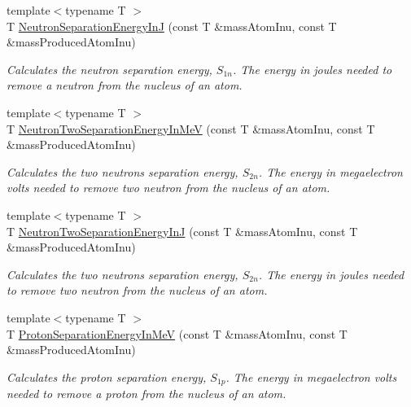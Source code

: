 \begin{DoxyCompactItemize}
{\footnotesize template$<$typename T $>$ }\\T \mbox{\hyperlink{group___e_g_x_phys-_nuclear_separation_energy_ga14a4bb972ae000ef4ff35f2734ff22d0}{Neutron\+Separation\+Energy\+InJ}} (const T \&mass\+Atom\+Inu, const T \&mass\+Produced\+Atom\+Inu)
\begin{DoxyCompactList}\small\item\em Calculates the neutron separation energy, $S_{1n}$. The energy in joules needed to remove a neutron from the nucleus of an atom. \end{DoxyCompactList}\item 
{\footnotesize template$<$typename T $>$ }\\T \mbox{\hyperlink{group___e_g_x_phys-_nuclear_separation_energy_ga09985fc876eb632695bfbc1f2f325401}{Neutron\+Two\+Separation\+Energy\+In\+MeV}} (const T \&mass\+Atom\+Inu, const T \&mass\+Produced\+Atom\+Inu)
\begin{DoxyCompactList}\small\item\em Calculates the two neutrons separation energy, $S_{2n}$. The energy in megaelectron volts needed to remove two neutron from the nucleus of an atom. \end{DoxyCompactList}\item 
{\footnotesize template$<$typename T $>$ }\\T \mbox{\hyperlink{group___e_g_x_phys-_nuclear_separation_energy_ga293ac9428420a0adf4235048dbe529b4}{Neutron\+Two\+Separation\+Energy\+InJ}} (const T \&mass\+Atom\+Inu, const T \&mass\+Produced\+Atom\+Inu)
\begin{DoxyCompactList}\small\item\em Calculates the two neutrons separation energy, $S_{2n}$. The energy in joules needed to remove two neutron from the nucleus of an atom. \end{DoxyCompactList}\item 
{\footnotesize template$<$typename T $>$ }\\T \mbox{\hyperlink{group___e_g_x_phys-_nuclear_separation_energy_ga6a619ded55c47ed22ea2d8a85202ebeb}{Proton\+Separation\+Energy\+In\+MeV}} (const T \&mass\+Atom\+Inu, const T \&mass\+Produced\+Atom\+Inu)
\begin{DoxyCompactList}\small\item\em Calculates the proton separation energy, $S_{1p}$. The energy in megaelectron volts needed to remove a proton from the nucleus of an atom. \end{DoxyCompactList}\item 

\end{DoxyCompactItemize}
